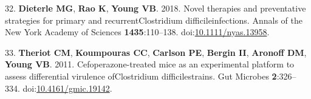 \documentclass[
  11pt,
]{article}
\begin{document}
\leavevmode\hypertarget{ref-Dieterle2018}{}%
32. \textbf{Dieterle MG}, \textbf{Rao K}, \textbf{Young VB}. 2018. Novel
therapies and preventative strategies for primary and
recurrentClostridium difficileinfections. Annals of the New York Academy
of Sciences \textbf{1435}:110--138.
doi:\href{https://doi.org/10.1111/nyas.13958}{10.1111/nyas.13958}.

\leavevmode\hypertarget{ref-Theriot2011}{}%
33. \textbf{Theriot CM}, \textbf{Koumpouras CC}, \textbf{Carlson PE},
\textbf{Bergin II}, \textbf{Aronoff DM}, \textbf{Young VB}. 2011.
Cefoperazone-treated mice as an experimental platform to assess
differential virulence ofClostridium difficilestrains. Gut Microbes
\textbf{2}:326--334.
doi:\href{https://doi.org/10.4161/gmic.19142}{10.4161/gmic.19142}.
\end{document}
